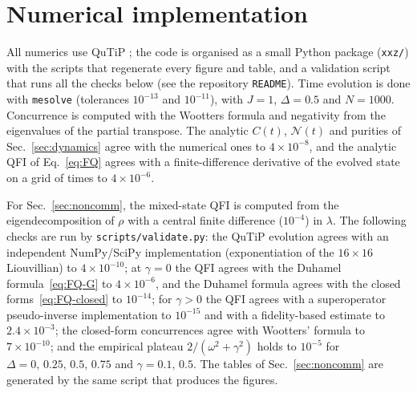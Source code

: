 \documentclass[11pt,a4paper]{article}
\begin{document}
\section{Numerical implementation}
All numerics use QuTiP \cite{QuTiP2012}; the code is organised as a small Python package (\texttt{xxz/}) with the scripts that regenerate every figure and table, and a validation script that runs all the checks below (see the repository \texttt{README}). Time evolution is done with \texttt{mesolve} (tolerances $10^{-13}$ and $10^{-11}$), with $J=1$, $\Delta=0.5$ and $N=1000$. Concurrence is computed with the Wootters formula and negativity from the eigenvalues of the partial transpose. The analytic $C(t)$, $\mathcal N(t)$ and purities of Sec.~\ref{sec:dynamics} agree with the numerical ones to $4\times10^{-8}$, and the analytic QFI of Eq.~\eqref{eq:FQ} agrees with a finite-difference derivative of the evolved state on a grid of times to $4\times10^{-6}$.

For Sec.~\ref{sec:noncomm}, the mixed-state QFI is computed from the eigendecomposition of $\rho$ with a central finite difference ($10^{-4}$) in $\lambda$. The following checks are run by \texttt{scripts/validate.py}: the QuTiP evolution agrees with an independent NumPy/SciPy implementation (exponentiation of the $16\times16$ Liouvillian) to $4\times10^{-10}$; at $\gamma=0$ the QFI agrees with the Duhamel formula~\eqref{eq:FQ-G} to $4\times10^{-6}$, and the Duhamel formula agrees with the closed forms~\eqref{eq:FQ-closed} to $10^{-14}$; for $\gamma>0$ the QFI agrees with a superoperator pseudo-inverse implementation to $10^{-15}$ and with a fidelity-based estimate to $2.4\times10^{-3}$; the closed-form concurrences agree with Wootters' formula to $7\times10^{-10}$; and the empirical plateau $2/(\omega^2+\gamma^2)$ holds to $10^{-5}$ for $\Delta=0,\,0.25,\,0.5,\,0.75$ and $\gamma=0.1,\,0.5$. The tables of Sec.~\ref{sec:noncomm} are generated by the same script that produces the figures.
\end{document}
